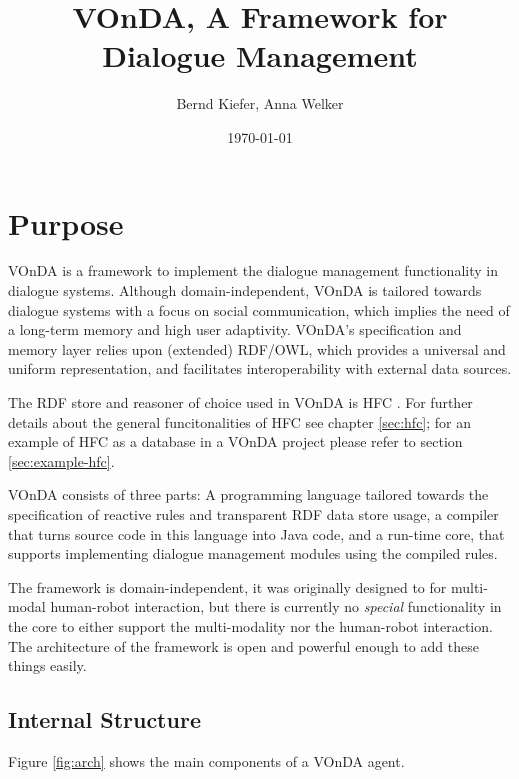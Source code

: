 \documentclass[a4paper]{report}
\newcommand{\vonda}{VOnDA\xspace}
\begin{document}
\title{\vonda, A Framework for Dialogue Management}

\author{Bernd Kiefer, Anna Welker}
\date{\today}

\maketitle

\tableofcontents

\chapter{Purpose}

\vonda is a framework to implement the dialogue management functionality in
dialogue systems. Although domain-independent, \vonda is tailored towards
dialogue systems with a focus on social communication, which implies the need
of a long-term memory and high user adaptivity. \vonda's specification and
memory layer relies upon (extended) RDF/OWL, which provides a universal and
uniform representation, and facilitates interoperability with external data
sources.

The RDF store and reasoner of choice used in \vonda is HFC
\citep{krieger2013efficient}. For further details about the general
funcitonalities of HFC see chapter \ref{sec:hfc}; for an example of HFC as a
database in a \vonda project please refer to section \ref{sec:example-hfc}.

\vonda consists of three parts: A programming language tailored towards the
specification of reactive rules and transparent RDF data store usage, a
compiler that turns source code in this language into Java code, and a run-time
core, that supports implementing dialogue management modules using the compiled
rules.

The framework is domain-independent, it was originally designed to for
multi-modal human-robot interaction, but there is currently no \emph{special}
functionality in the core to either support the multi-modality nor the
human-robot interaction. The architecture of the framework is open and powerful
enough to add these things easily.


\section{Internal Structure}

Figure \ref{fig:arch} shows the main components of a \vonda agent.
\end{document}
